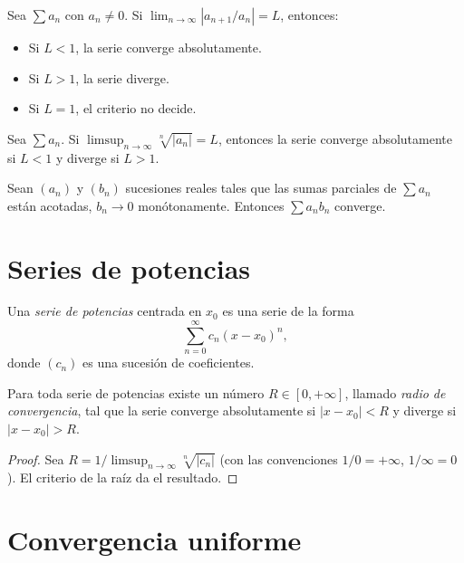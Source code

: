\begin{theorem}
\label{teo:cociente-series}
Sea $\sum a_n$ con $a_n\neq 0$. Si $\lim_{n\to\infty}|a_{n+1}/a_n|=L$, entonces:
\begin{itemize}
  \item Si $L<1$, la serie converge absolutamente.
  \item Si $L>1$, la serie diverge.
  \item Si $L=1$, el criterio no decide.
\end{itemize}
\end{theorem}

\begin{theorem}
\label{teo:raiz}
Sea $\sum a_n$. Si $\limsup_{n\to\infty}\sqrt[n]{|a_n|}=L$, entonces la serie converge absolutamente si $L<1$ y diverge si $L>1$.
\end{theorem}

\begin{theorem}
\label{teo:dirichlet}
Sean $(a_n)$ y $(b_n)$ sucesiones reales tales que las sumas parciales de $\sum a_n$ están acotadas, $b_n\to 0$ monótonamente. Entonces $\sum a_nb_n$ converge.
\end{theorem}

\section{Series de potencias}

\begin{definition}
\label{def:serie-potencias}
Una \emph{serie de potencias} centrada en $x_0$ es una serie de la forma
\[
  \sum_{n=0}^{\infty}c_n(x-x_0)^n,
\]
donde $(c_n)$ es una sucesión de coeficientes.
\end{definition}

\begin{theorem}
\label{teo:radio-convergencia}
Para toda serie de potencias existe un número $R\in[0,+\infty]$, llamado \emph{radio de convergencia}, tal que la serie converge absolutamente si $|x-x_0|<R$ y diverge si $|x-x_0|>R$.
\end{theorem}
\begin{proof}
Sea $R=1/\limsup_{n\to\infty}\sqrt[n]{|c_n|}$ (con las convenciones $1/0=+\infty$, $1/\infty=0$). El criterio de la raíz da el resultado.
\end{proof}

\section{Convergencia uniforme}

